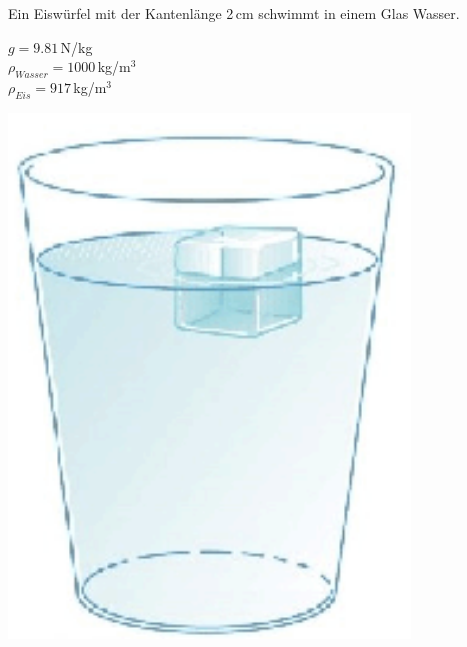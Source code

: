 \documentclass[11pt]{article}
\begin{document}
\begin{minipage}{0.8\textwidth}
Ein Eiswürfel mit der Kantenlänge 2\,cm schwimmt in einem Glas Wasser.

	$g = 9.81\,$N/kg\\
	$\rho_{Wasser} = 1000\,$kg/m$^3$ \\
	$\rho_{Eis} = 917\,$kg/m$^3$
\end{minipage}
\begin{minipage}{0.2\textwidth}
    \begin{flushright}
        \includegraphics[width=0.8\textwidth]{images/Beispiel-Eis.png}
    \end{flushright}

\end{minipage}
\end{document}
